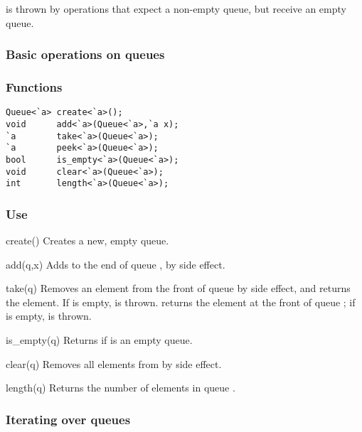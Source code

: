  is thrown by operations that expect a non-empty queue, but
receive an empty queue.

\subsubsection*{Basic operations on queues}
\subsubsection*{Functions}
\begin{verbatim}
Queue<`a> create<`a>();
void      add<`a>(Queue<`a>,`a x);
`a        take<`a>(Queue<`a>);
`a        peek<`a>(Queue<`a>);
bool      is_empty<`a>(Queue<`a>);
void      clear<`a>(Queue<`a>);
int       length<`a>(Queue<`a>);  
\end{verbatim}

\subsubsection*{Use}

\begin{defun}{create}{()}
Creates a new, empty queue.
\end{defun}

\begin{defun}{add}{(q,x)}
Adds  to the end of queue , by side effect.
\end{defun}

\begin{defun}{take}{(q)}
Removes an element from the front of queue  by side effect, and
returns the element.  If  is empty,  is thrown.
 returns the element at the front of queue ;
if  is empty,  is thrown.
\end{defun}

\begin{defun}{is_empty}{(q)}
Returns  if  is an empty queue.
\end{defun}

\begin{defun}{clear}{(q)}
Removes all elements from  by side effect.
\end{defun}

\begin{defun}{length}{(q)}
Returns the number of elements in queue .
\end{defun}

\subsubsection*{Iterating over queues}
